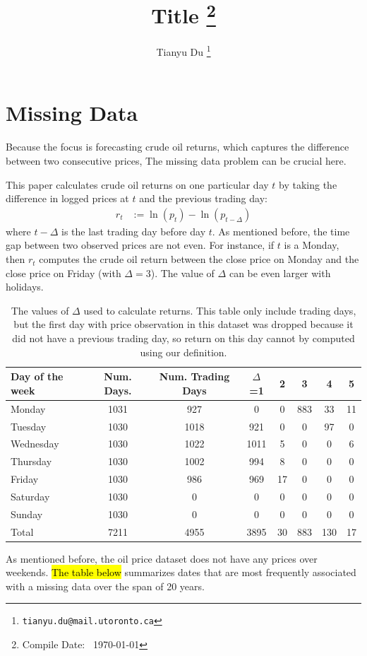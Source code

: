 \documentclass[12pt]{article}
\title{Title \footnote{Compile Date: \currenttime\ \today}}
\author{Tianyu Du \footnote{\texttt{tianyu.du@mail.utoronto.ca}}}
\begin{document}
	\maketitle
	\tableofcontents
	\newpage

	\section{Missing Data}
	\paragraph{} Because the focus is forecasting crude oil returns, which captures the difference between two consecutive prices, The missing data problem can be crucial here.

	\par This paper calculates crude oil returns on one particular day $t$ by taking the difference in logged prices at $t$ and the previous trading day:
	\begin{align}
		r_t &:= \ln(p_t) - \ln(p_{t - \Delta})
	\end{align}
	where $t - \Delta$ is the last trading day before day $t$. As mentioned before, the time gap between two observed prices are not even. For instance, if $t$ is a Monday, then $r_t$ computes the crude oil return between the close price on Monday and the close price on Friday (with $\Delta = 3$). The value of $\Delta$ can be even larger with holidays.

	\begin{table}[H]
		\center
		\small
		\begin{tabular}{|l|c c c c c c c|}
			\hline
			Day of the week & Num. Days. & Num. Trading Days & $\Delta$=1 & 2 & 3 & 4 & 5 \\
			\hline
			Monday & 1031 & 927 & 0 & 0 & 883 & 33 & 11 \\
			Tuesday & 1030 & 1018 & 921 & 0 & 0 & 97 & 0 \\
			Wednesday & 1030 & 1022 & 1011 & 5 & 0 & 0 & 6 \\
			Thursday & 1030 & 1002 & 994 & 8 & 0 & 0 & 0 \\
			Friday & 1030 & 986 & 969 & 17 & 0 & 0 & 0 \\
			Saturday & 1030 & 0 & 0 & 0 & 0 & 0 & 0 \\
			Sunday & 1030 & 0 & 0 & 0 & 0 & 0 & 0 \\
			\hline
			Total & 7211 & 4955 & 3895 & 30 & 883 & 130 & 17 \\
			\hline
		\end{tabular}
		\caption{The values of $\Delta$ used to calculate returns. This table only include trading days, but the first day with price observation in this dataset was dropped because it did not have a previous trading day, so return on this day cannot by computed using our definition.}
	\end{table}
	\par As mentioned before, the oil price dataset does not have any prices over weekends. \hl{The table below} summarizes dates that are most frequently associated with a missing data over the span of 20 years.
\end{document}
